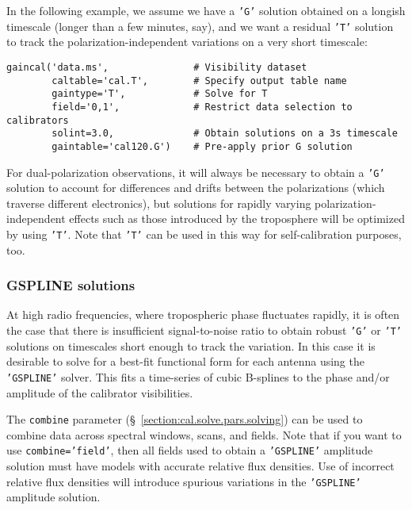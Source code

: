In the following example, we assume we have a {\tt 'G'} solution obtained on
a longish timescale (longer than a few minutes, say), and we want a residual
{\tt 'T'} solution to track the polarization-independent variations on a
very short timescale:

\small
\begin{verbatim}
gaincal('data.ms',               # Visibility dataset
        caltable='cal.T',        # Specify output table name
        gaintype='T',            # Solve for T
        field='0,1',             # Restrict data selection to calibrators
        solint=3.0,              # Obtain solutions on a 3s timescale
        gaintable='cal120.G')    # Pre-apply prior G solution
\end{verbatim}
\normalsize

For dual-polarization observations, it will always be necessary to
obtain a {\tt 'G'} solution to account for differences and drifts between
the polarizations (which traverse different electronics), but
solutions for rapidly varying polarization-independent effects such as
those introduced by the troposphere will be optimized by using {\tt 'T'}.
Note that {\tt 'T'} can be used in this way for self-calibration purposes,
too.

\subsubsection{GSPLINE solutions}
\label{section:cal.solve.gain.gspline}

At high radio frequencies, where tropospheric phase fluctuates
rapidly, it is often the case that there is insufficient
signal-to-noise ratio to obtain robust {\tt 'G'} or {\tt 'T'}
solutions on timescales short enough to track the 
variation.  In this case it is desirable to solve for a best-fit
functional form for each antenna using the {\tt 'GSPLINE'} solver.  
This fits a time-series of cubic B-splines to the phase and/or
amplitude of the calibrator visibilities.  

The {\tt combine} parameter (\S~\ref{section:cal.solve.pars.solving}) 
can be used to combine data across spectral windows, scans, and
fields.  Note that if you want to use {\tt combine='field'},
then all fields used to obtain a {\tt 'GSPLINE'} amplitude solution must have
models with accurate relative flux densities.  Use of incorrect
relative flux densities will introduce spurious variations in the
{\tt 'GSPLINE'} amplitude solution.

